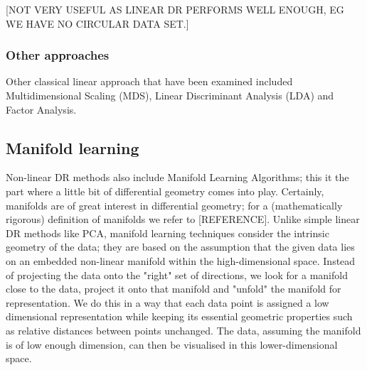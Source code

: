\documentclass[journal, a4paper]{IEEEtran}
\begin{document}
[NOT VERY USEFUL AS LINEAR DR PERFORMS WELL ENOUGH, EG WE HAVE NO CIRCULAR DATA SET.] 


\hfill
\subsubsection{Other approaches}

Other classical linear approach that have been examined included Multidimensional Scaling (MDS), Linear Discriminant Analysis (LDA) and Factor Analysis. 



\subsection{Manifold learning}

Non-linear DR methods also include Manifold Learning Algorithms; this it the part where a little bit of differential geometry comes into play. Certainly, manifolds are of great interest in differential geometry; for a (mathematically rigorous) definition of manifolds we refer to [REFERENCE].
Unlike simple linear DR methods like PCA, manifold learning techniques consider the intrinsic geometry of the data; they are based on the assumption that the given data lies on an embedded non-linear manifold within the high-dimensional space. 
Instead of projecting the data onto the "right" set of directions, we look for a manifold close to the data, project it onto that manifold and "unfold" the manifold for representation. We do this in a way that each data point is assigned a low dimensional representation while keeping its essential geometric properties such as relative distances between points unchanged.
The data, assuming the manifold is of low enough dimension, can then be visualised in this lower-dimensional space.\\
\end{document}
